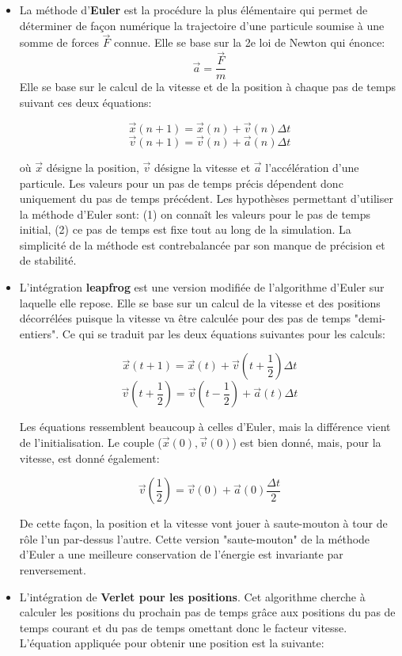 \begin{itemize}
	\item La méthode d'\textbf{Euler} est la procédure la plus élémentaire qui permet de déterminer de façon numérique la trajectoire d'une particule soumise à une somme de forces $\overrightarrow{F}$ connue. Elle se base sur la 2e loi de Newton qui énonce:
	$$\overrightarrow{a} = \frac{\overrightarrow{F}}{m}$$
	Elle se base sur le calcul de la vitesse et de la position à chaque pas de temps suivant ces deux équations:

	$$\overrightarrow{x}(n+1) = \overrightarrow{x}(n) + \overrightarrow{v}(n)\Delta t$$
	$$\overrightarrow{v}(n+1) = \overrightarrow{v}(n) + \overrightarrow{a}(n)\Delta t$$

	où $\overrightarrow{x}$ désigne la position, $\overrightarrow{v}$ désigne la vitesse et $\overrightarrow{a}$ l'accélération d'une particule.
	Les valeurs pour un pas de temps précis dépendent donc uniquement du pas de temps précédent. Les hypothèses permettant d'utiliser la méthode d'Euler sont: (1) on connaît les valeurs pour le pas de temps initial, (2) ce pas de temps est fixe tout au long de la simulation. La simplicité de la méthode est contrebalancée par son manque de précision et de stabilité.
	\item L'intégration \textbf{leapfrog} est une version modifiée de l'algorithme d'Euler sur laquelle elle repose. Elle se base sur un calcul de la vitesse et des positions décorrélées puisque la vitesse va être calculée pour des pas de temps "demi-entiers". Ce qui se traduit par les deux équations suivantes pour les calculs:

	$$\overrightarrow{x}(t+1) = \overrightarrow{x}(t) + \overrightarrow{v}(t+\frac{1}{2})\Delta t$$
	$$\overrightarrow{v}(t+\frac{1}{2}) = \overrightarrow{v}(t-\frac{1}{2}) + \overrightarrow{a}(t)\Delta t$$

	Les équations ressemblent beaucoup à celles d'Euler, mais la différence vient de l'initialisation. Le couple ($\overrightarrow{x}(0),\overrightarrow{v}(0)$) est bien donné, mais, pour la vitesse, est donné également:

	$$\overrightarrow{v}(\frac{1}{2}) = \overrightarrow{v}(0) + \overrightarrow{a}(0)\frac{\Delta t}{2}$$

	De cette façon, la position et la vitesse vont jouer à saute-mouton à tour de rôle l'un par-dessus l'autre. Cette version "saute-mouton" de la méthode d'Euler a une meilleure conservation de l'énergie est invariante par renversement.
	\item L'intégration de \textbf{Verlet pour les positions}. Cet algorithme cherche à calculer les positions du prochain pas de temps grâce aux positions du pas de temps courant et du pas de temps omettant donc le facteur vitesse. L'équation appliquée pour obtenir une position est la suivante: 


\end{itemize}
